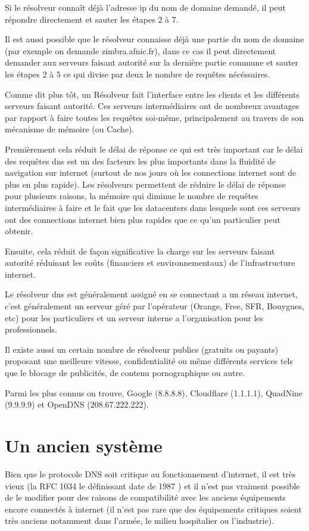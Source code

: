 Si le résolveur connaît déjà l’adresse ip du nom de domaine demandé, il peut répondre directement et sauter les étapes 2 à 7.

Il est aussi possible que le résolveur connaisse déjà une partie du nom de domaine (par exemple on demande zimbra.afnic.fr), dans ce cas il peut directement demander aux serveurs faisant autorité sur la dernière partie commune et sauter les étapes 2 à 5 ce qui divise par deux le nombre de requêtes nécéssaires.

Comme dit plus tôt, un Résolveur fait l’interface entre les clients et les différents serveurs faisant autorité. Ces serveurs intermédiaires ont de nombreux avantages par rapport à faire toutes les requêtes soi-même, principalement au travers de son mécanisme de mémoire (ou Cache).

Premièrement cela réduit le délai de réponse ce qui est très important car le délai des requêtes dns est un des facteurs les plus importants dans la fluidité de navigation sur internet (surtout de nos jours où les connections internet sont de plus en plus rapide). Les résolveurs permettent de réduire le délai de réponse pour plusieurs raisons, la mémoire qui diminue le nombre de requêtes intermédiaires à faire et le fait que les datacenters dans lesquels sont ces serveurs ont des connections internet bien plus rapides que ce qu’un particulier peut obtenir.

Ensuite, cela réduit de façon significative la charge sur les serveurs faisant autorité réduisant les coûts (financiers et environnementaux) de l’infrastructure internet.

Le résolveur dns est généralement assigné en se connectant a un réseau internet, c’est généralement un serveur géré par l’opérateur (Orange, Free, SFR, Bouygues, etc) pour les particuliers et un serveur interne a l’organisation pour les professionnels.

Il existe aussi un certain nombre de résolveur publics (gratuits ou payants) proposant une meilleure vitesse, confidentialité ou même différents services tels que le blocage de publicités, de contenu pornographique ou autre.

Parmi les plus connus on trouve, Google (8.8.8.8), Cloudflare (1.1.1.1), QuadNine (9.9.9.9) et OpenDNS (208.67.222.222).

\section{Un ancien système}
Bien que le protocole DNS soit critique au fonctionnement d’internet, il est très vieux (la RFC 1034 le définissant date de 1987 \cite{dnsRFC}) et il n’est pas vraiment possible de le modifier pour des raisons de compatibilité avec les anciens équipements encore connectés à internet (il n’est pas rare que des équipements critiques soient très anciens notamment dans l’armée, le milieu hospitalier ou l’industrie).

